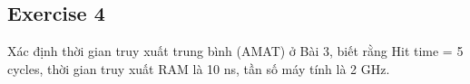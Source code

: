 \subsection{Exercise 4}
Xác định thời gian truy xuất trung bình (AMAT) ở Bài 3, biết rằng Hit time = 5 cycles, thời gian truy xuất RAM là 10 ns, tần số máy tính là 2 GHz.


